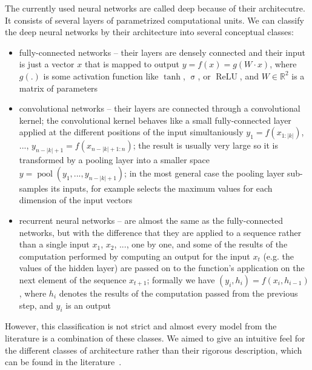 \documentclass[runningheads,a4paper]{llncs}
\begin{document}
The currently used neural networks are called deep because of their architecutre. It consists of several layers of parametrized computational units. We can classify the deep neural networks by their architecture into several conceptual classes:
\begin{itemize}
  \item fully-connected networks -- their layers are densely connected and their input is just a vector $x$ that is mapped to output $y=f(x)=g(W\cdot x)$, where $g(.)$ is some activation function like $\operatorname{tanh}$, $\operatorname{\sigma}$, or $\operatorname{ReLU}$, and $W\in \mathbb{R}^2$ is a matrix of parameters
  \item convolutional networks -- their layers are connected through a convolutional kernel; the convolutional kernel behaves like a small fully-connected layer applied at the different positions of the input simultaniously $y_1=f(x_{1:|k|})$, ..., $y_{n-|k|+1}=f(x_{n-|k|+1:n})$; the result is usually very large so it is transformed by a pooling layer into a smaller space $y=\operatorname{pool}(y_1, ..., y_{n-|k|+1})$; in the most general case the pooling layer sub-samples its inputs, for example selects the maximum values for each dimension of the input vectors
  \item recurrent neural networks -- are almost the same as the fully-connected networks, but with the difference that they are applied to a sequence rather than a single input $x_1$, $x_2$, ..., one by one, and some of the results of the computation performed by computing an output for the input $x_t$ (e.g. the values of the hidden layer) are passed on to the function's application on the next element of the sequence $x_{t+1}$; formally we have $(y_i, h_i) = f(x_i, h_{i-1})$, where $h_i$ denotes the results of the computation passed from the previous step, and $y_i$ is an output
\end{itemize}
However, this classification is not strict and almost every model from the literature is a combination of these classes. We aimed to give an intuitive feel for the different classes of architecture rather than their rigorous description, which can be found in the literature~\cite{graves2013generating}.
\end{document}
